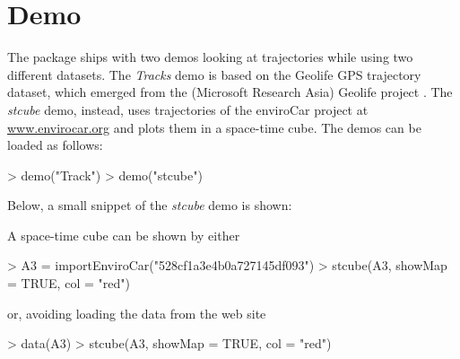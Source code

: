 \documentclass{article}
\begin{document}
\section{Demo}

The package ships with two demos looking at trajectories while using two different datasets. The \emph{Tracks} demo is based on the Geolife GPS trajectory dataset, which emerged from the (Microsoft Research Asia) Geolife project \cite{zheng08, zheng09, zheng10}. The \emph{stcube} demo, instead, uses trajectories of the enviroCar project at \url{www.envirocar.org} and plots them in a space-time cube. The demos can be loaded as follows:

\begin{Schunk}
\begin{Sinput}
> demo("Track")
> demo("stcube")
\end{Sinput}
\end{Schunk}

Below, a small snippet of the \emph{stcube} demo is shown:


A space-time cube can be shown by either
\begin{Schunk}
\begin{Sinput}
> A3 = importEnviroCar("528cf1a3e4b0a727145df093")
> stcube(A3, showMap = TRUE, col = "red")
\end{Sinput}
\end{Schunk}
or, avoiding loading the data from the web site
\begin{Schunk}
\begin{Sinput}
> data(A3)
> stcube(A3, showMap = TRUE, col = "red")
\end{Sinput}
\end{Schunk}




\end{document}
